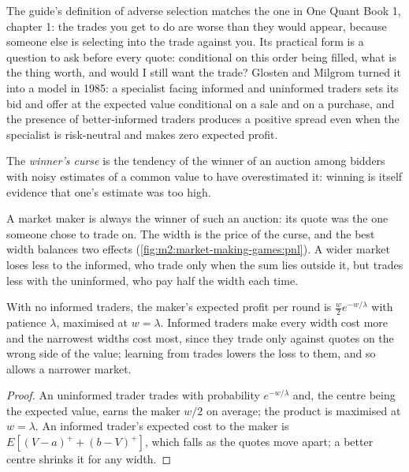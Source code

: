 The guide's definition of adverse selection matches the one in One Quant Book 1,
chapter 1: the trades you get to do are worse than they would appear, because someone else is
selecting into the trade against you. Its practical form is a question to ask before
every quote: conditional on this order being filled, what is the thing worth, and would I
still want the trade? Glosten and Milgrom turned it into a model in 1985: a specialist facing
informed and uninformed traders sets its bid and offer at the expected value conditional
on a sale and on a purchase, and the presence of better-informed traders produces a
positive spread even when the specialist is risk-neutral and makes zero expected profit.

\begin{definition}\label{def:m2:market-making-games:curse}
The \emph{winner's curse} is the tendency of the winner of an auction
among bidders with noisy estimates of a common value to have overestimated it: winning is
itself evidence that one's estimate was too high.
\end{definition}

A market maker is always the winner of such an auction: its quote was the one someone
chose to trade on. The width is the price of the curse, and the best width balances two
effects (\cref{fig:m2:market-making-games:pnl}). A wider market loses less to the
informed, who trade only when the sum lies outside it, but trades less with the
uninformed, who pay half the width each time.

\begin{proposition}\label{prop:m2:market-making-games:width}
With no informed traders, the maker's expected profit per round is $\tfrac w2 e^{-w/\lambda}$
with patience $\lambda$, maximised at $w = \lambda$. Informed traders make every width
cost more and the narrowest widths cost most, since they trade only against quotes on the
wrong side of the value; learning from trades lowers the loss to them, and so allows a
narrower market.
\end{proposition}

\begin{proof}
An uninformed trader trades with probability $e^{-w/\lambda}$ and, the centre being the
expected value, earns the maker $w/2$ on average; the product is maximised at $w = \lambda$.
An informed trader's expected cost to the maker is $E[(V - a)^+ + (b - V)^+]$, which falls
as the quotes move apart; a better centre shrinks it for any width.
\end{proof}

